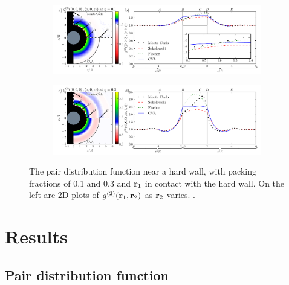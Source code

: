 \begin{figure}
  \begin{subfigure}{\textwidth}
    \includegraphics[width=\linewidth]{figs/pair-correlation-pretty-1.pdf}
    \vspace{-0.6cm}
  \end{subfigure}
  \begin{subfigure}{\textwidth}
    \includegraphics[width=\linewidth]{figs/pair-correlation-pretty-3.pdf}
    \vspace{-0.6cm}
  \end{subfigure}
  \caption{The pair distribution function near a hard wall, with
    packing fractions of 0.1 and 0.3 and $\textbf{r}_1$ in contact with the
    hard wall.  On the left are 2D plots of $g^{(2)}(\textbf{r}_1,\textbf{r}_2)$ as
    $\textbf{r}_2$ varies. .}
  \label{fig:pair-distribution}
\end{figure}

\section{Results}

\subsection{Pair distribution function}



